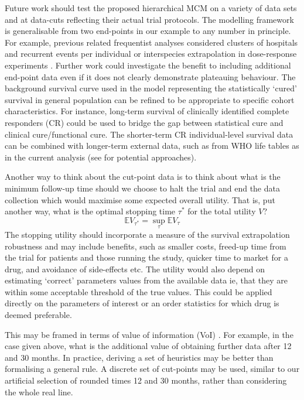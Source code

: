 \documentclass[AMA,STIX1COL]{WileyNJD-v2}
\begin{document}
Future work should test the proposed hierarchical MCM on a variety of data sets and at data-cuts reflecting their actual trial protocols.
The modelling framework is generalisable from two end-points in our example to any number in principle.
For example, previous related frequentist analyses considered clusters of hospitals and recurrent events per individual \citep{Lai2008, Lai2009} or interspecies extrapolation in dose-response experiments \citep{DuMouchel1983}.
Further work could investigate the benefit to including additional end-point data even if it does not clearly demonstrate plateauing behaviour.
The background survival curve used in the model representing the statistically `cured' survival in general population can be refined to be appropriate to specific cohort characteristics. For instance, long-term survival of clinically identified complete responders (CR) could be used to bridge the gap between statistical cure and clinical cure/functional cure. The shorter-term CR individual-level survival data can be combined with longer-term external data, such as from WHO life tables as in the current analysis (see \citep{Jackson2017} for potential approaches).

Another way to think about the cut-point data is to think about what is the minimum follow-up time should we choose to halt the trial and end the data collection which would maximise some expected overall utility.
That is, put another way, what is the optimal stopping time $\tau^*$ for the total utility $V$?
$$
\mathbb{E} V_{\tau^*} = \sup_{\tau} \mathbb{E} V_{\tau}
$$
The stopping utility should incorporate a measure of the survival extrapolation robustness and may include benefits, such as smaller costs, freed-up time from the trial for patients and those running the study, quicker time to market for a drug, and avoidance of side-effects etc.
The utility would also depend on estimating `correct' parameters values from the available data ie, that they are within some acceptable threshold of the true values.
This could be applied directly on the parameters of interest or an order statistics for which drug is deemed preferable.

This may be framed in terms of value of information (VoI) \citep{Heath2017}.
For example, in the case given above, what is the additional value of obtaining further data after 12 and 30 months.
In practice, deriving a set of heuristics may be better than formalising a general rule.
A discrete set of cut-points may be used, similar to our artificial selection of rounded times 12 and 30 months, rather than considering the whole real line.
\end{document}

